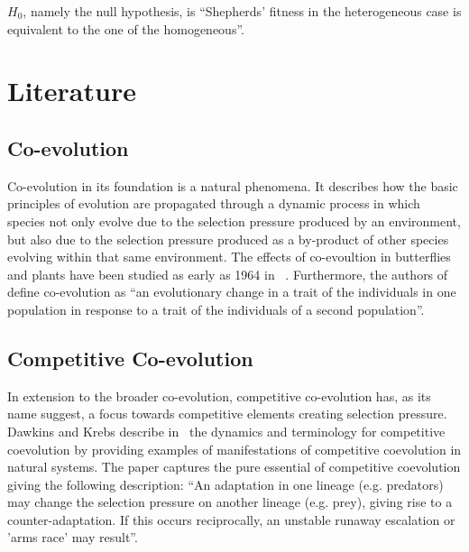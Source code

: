 \documentclass[conference]{IEEEtran}
\begin{document}
$H_0$, namely the null hypothesis, is ``Shepherds’ fitness in the heterogeneous case is equivalent to the one of the homogeneous''.

\section{Literature}
 
\subsection{Co-evolution}
Co-evolution in its foundation is a natural phenomena.
It describes how the basic principles of evolution are propagated through a dynamic process in which species not only evolve due to the selection pressure produced by an environment, but also due to the selection pressure produced as a by-product of other species evolving within that same environment.
The effects of co-evoultion in butterflies and plants have been studied as early as 1964 in ~\cite{ehrlich1964butterflies}.
Furthermore, the authors of ~\cite{janzen1980coevolution} define co-evolution as ``an evolutionary change in a trait of the individuals in one population in response to a trait of the individuals of a second population''. 


\subsection{Competitive Co-evolution}
In extension to the broader co-evolution, competitive co-evolution has, as its name suggest, a focus towards competitive elements creating selection pressure.
Dawkins and Krebs describe in~\cite{dawkins1979arms} the dynamics and terminology for competitive coevolution by providing examples of manifestations of competitive coevolution in natural systems. 
The paper captures the pure essential of competitive coevolution giving the following description: ``An adaptation in one lineage (e.g. predators) may change the selection pressure on another lineage (e.g. prey), giving rise to a counter-adaptation. If this occurs reciprocally, an unstable runaway escalation or 'arms race' may result''.
\end{document}
